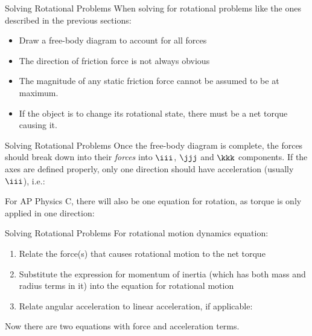 \documentclass[12pt,compress,aspectratio=169]{beamer}
\begin{document}
\begin{frame}{Solving Rotational Problems}
  When solving for rotational problems like the ones described in the previous
  sections:
  \begin{itemize}
  \item Draw a free-body diagram to account for all forces
  \item The direction of friction force is not always obvious
  \item The magnitude of any static friction force cannot be assumed to be at
    maximum.
  \item If the object is to change its rotational state, there must be a net
    torque causing it.
  \end{itemize}
\end{frame}



\begin{frame}{Solving Rotational Problems}
  Once the free-body diagram is complete, the forces should break down into
  their \emph{forces} into $\iii$, $\jjj$ and $\kkk$ components. If the axes
  are defined properly, only one direction should have acceleration (usually
  $\iii$), i.e.:
  

  For AP Physics C, there will also be one equation for rotation, as torque is
  only applied in one direction:
    
\end{frame}



\begin{frame}{Solving Rotational Problems}
  For rotational motion dynamics equation:
  \begin{enumerate}
  \item Relate the force(s) that causes rotational motion to the net torque

  \item Substitute the expression for momentum of inertia (which has both mass
    and radius terms in it) into the equation for rotational motion
  \item Relate angular acceleration to linear acceleration, if applicable:

  \end{enumerate}
  Now there are two equations with force and acceleration terms.
\end{frame}
\end{document}

